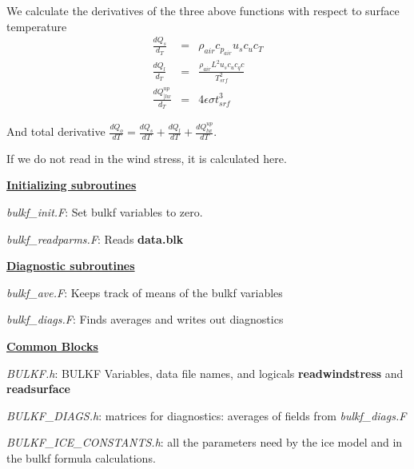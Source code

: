 We calculate the derivatives of the three above functions
with respect to surface temperature
\begin{eqnarray}
\frac{dQ_s}{d_T} & = & \rho_{air} c_{p_{air}} u_s c_u c_T \nonumber \\
\frac{dQ_l}{d_T} & = & \frac{\rho_{air} L^2 u_s c_u c_q c}{T_{srf}^2} \nonumber \\
\frac{dQ_{]lw}^{up}}{d_T} & = &  4 \epsilon \sigma t_{srf}^3 \nonumber
\end{eqnarray}

And total derivative $\frac{dQ_o}{dT}= \frac{dQ_s}{dT} +
\frac{dQ_l}{dT} + \frac{dQ_{lw}^{up}}{dT}$.




If we do not read in the wind stress, it is calculated here.


\vspace{1cm}

\noindent
{\bf {\underline{Initializing subroutines}}}

\noindent
{\it bulkf\_init.F}:
Set bulkf variables to zero.

\noindent
{\it bulkf\_readparms.F}:
Reads {\bf data.blk}


\vspace{1cm}

\noindent
{\bf {\underline{Diagnostic subroutines}}}

\noindent
{\it bulkf\_ave.F}:
Keeps track of means of the bulkf variables

\noindent
{\it bulkf\_diags.F}:
Finds averages and writes out diagnostics

\vspace{1cm}

\noindent
{\bf {\underline{Common Blocks}}}

\noindent
{\it BULKF.h}: BULKF Variables,  data file names, and logicals
{\bf readwindstress} and {\bf readsurface}

\noindent
{\it BULKF\_DIAGS.h}: matrices for diagnostics: averages of fields
from {\it bulkf\_diags.F}

\noindent
{\it BULKF\_ICE\_CONSTANTS.h}: 
all the parameters need by the ice model and in the bulkf formula
calculations.

\vspace{1cm}

